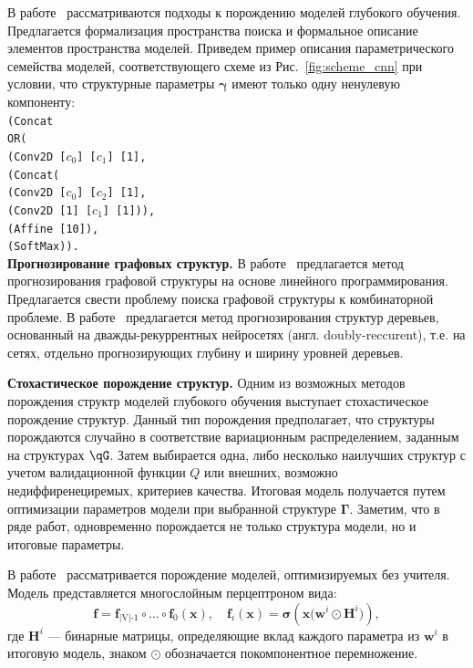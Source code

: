 В работе~\cite{search_space} рассматриваются подходы к порождению моделей глубокого обучения. Предлагается формализация пространства поиска и формальное описание элементов  пространства моделей. Приведем пример описания параметрического семейства моделей, соответствующего схеме из Рис.~\ref{fig:scheme_cnn} при условии, что структурные параметры $\boldsymbol{\gamma}$ имеют только одну ненулевую компоненту:\\
\texttt{(Concat\\
\text{\quad}OR(\\
\text{\quad\quad}(Conv2D [$c_0$] [$c_1$] [1],\\
\text{\quad\quad}(Concat(\\
\text{\quad\quad\quad}(Conv2D [$c_0$] [$c_2$] [1],\\
\text{\quad\quad\quad}(Conv2D [1] [$c_1$] [1])),\\
\text{\quad}(Affine [10]),\\
\text{\quad}(SoftMax)).} \\



\textbf{Прогнозирование графовых структур. }
В работе~\cite{jaakkola2010learning} предлагается метод прогнозирования графовой структуры на основе линейного программирования. Предлагается свести проблему поиска графовой структуры к комбинаторной проблеме.
В работе~\cite{double_rnn} предлагается метод прогнозирования структур деревьев, основанный на дважды-рекуррентных нейросетях (англ. doubly-reccurent), т.е. на сетях, отдельно прогнозирующих глубину и ширину уровней деревьев.

\par{\textbf{Стохастическое порождение структур. }}
Одним из возможных методов порождения структр моделей глубокого обучения выступает стохастическое порождение структур.
Данный тип порождения предполагает, что структуры порождаются случайно в соответствие  вариационным распределением, заданным на структурах $\qG$. Затем выбирается одна, либо несколько наилучших структур с учетом валидационной функции $Q$ или внешних, возможно недиффиренециремых, критериев качества. Итоговая модель получается путем оптимизации параметров модели при выбранной структуре $\boldsymbol{\Gamma}$. 
Заметим, что в ряде работ, одновременно порождается не только структура модели, но и итоговые параметры.

В работе~\cite{cib} рассматривается порождение моделей, оптимизируемых без учителя. Модель представляется многослойным перцептроном вида:
\[
    \mathbf{f} = \mathbf{f}_\text{|V|-1} \circ \dots \circ \mathbf{f}_0 (\mathbf{x}), \quad \mathbf{f}_i(\mathbf{x}) = \boldsymbol{\sigma}(\mathbf{x} \bigl(\mathbf{w}^i \odot \mathbf{H}^i\bigr)),
\]
где $\mathbf{H}^i$ --- бинарные матрицы, определяющие вклад каждого параметра из $\mathbf{w}^i$ в итоговую модель, знаком $\odot$  обозначается покомпонентное перемножение. 

